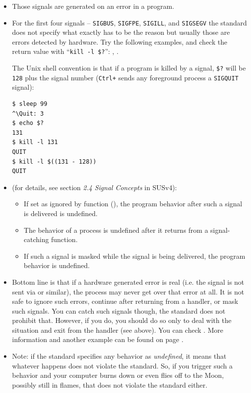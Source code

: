 \begin{itemize}
\item Those signals are generated on an error in a program.
\item {} For the first four signals --
\texttt{SIGBUS}, \texttt{SIGFPE}, \texttt{SIGILL}, and \texttt{SIGSEGV} the
standard does not specify what exactly has to be the reason but usually those
are errors detected by hardware.  Try the following examples, and check the
return value with ``\texttt{kill -l \$?}'': ,
.

\par The Unix shell convention is that if a program is killed by a signal,
\texttt{\$?} will be \texttt{128} plus the signal number (\texttt{Ctrl+\bs}
sends any foreground process a \texttt{SIGQUIT} signal):

\begin{verbatim}
$ sleep 99
^\Quit: 3
$ echo $?
131
$ kill -l 131
QUIT
$ kill -l $((131 - 128))
QUIT
\end{verbatim}

\item {}  (for details, see section \emph{2.4 Signal Concepts} in
SUSv4):
\begin{itemize}
\item If set as ignored by function (), the program behavior
after such a signal is delivered is undefined.
\item The behavior of a process is undefined after it returns from a
signal-catching function.
\item If such a signal is masked while the signal is being delivered, the
program behavior is undefined.
\end{itemize}
\item Bottom line is that if a hardware generated error is real (i.e. the signal
is not sent via  or similar), the process may never get
over that error at all.  It is not safe to ignore such errors, continue after
returning from a handler, or mask such signals.  You can catch such signals
though, the standard does not prohibit that.  However, if you do, you should do
so only to deal with the situation and exit from the handler (see above).
You can check . More information and another
example can be found on page \pageref{THREADS_SIGWAIT}.
\item Note: if the standard specifies any behavior as \emph{undefined}, it means
that whatever happens does not violate the standard.  So, if you trigger such a
behavior and your computer burns down or even flies off to the Moon, possibly
still in flames, that does not violate the standard either.
\end{itemize}

